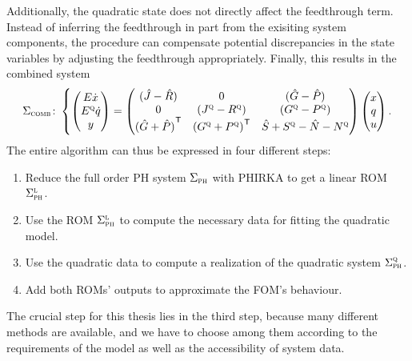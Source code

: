 Additionally, the quadratic state does not directly affect the feedthrough term.
Instead of inferring the feedthrough in part from the exisiting system components, the procedure can compensate potential discrepancies in the state variables by adjusting the feedthrough appropriately.
Finally, this results in the combined system
\begin{equation}\label{eq:combined-quadratic-system}
    \Sigma_{\textnormal{\scshape comb}} \colon \left\lbrace
    \begin{pmatrix}
        E \dot{x} \\
        E^{\textnormal{\scshape q}} \dot{q} \\
        y
    \end{pmatrix} = \begin{pmatrix}
        (\hat{J} - \hat{R}) & 0 & (\hat{G} - \hat{P}) \\
        0 & (J^{\textnormal{\scshape q}} - R^{\textnormal{\scshape q}}) & (G^{\textnormal{\scshape q}} - P^{\textnormal{\scshape q}}) \\
        {(\hat{G} + \hat{P})}^{\mkern1mu \mathsf{T}} & {(G^{\textnormal{\scshape q}} + P^{\textnormal{\scshape q}})}^{\mkern1mu \mathsf{T}} & \hat{S} + S^{\textnormal{\scshape q}} - \hat{N} - N^{\textnormal{\scshape q}}
    \end{pmatrix} \begin{pmatrix}
        x \\
        q \\
        u
    \end{pmatrix}.
    \right.
\end{equation}
The entire algorithm can thus be expressed in four different steps:
\begin{enumerate}
    \item Reduce the full order \ac{PH} system $\Sigma_{\textnormal{\scshape ph}}$ with \ac{PHIRKA} to get a linear \ac{ROM} $\Sigma_{\textnormal{\scshape ph}}^{\textnormal{\scshape l}}$.
    \item Use the \ac{ROM} $\Sigma_{\textnormal{\scshape ph}}^{\textnormal{\scshape l}}$ to compute the necessary data for fitting the quadratic model.
    \item Use the quadratic data to compute a realization of the quadratic system $\Sigma_{\textnormal{\scshape ph}}^{\textnormal{\scshape q}}$.
    \item Add both \acp{ROM}' outputs to approximate the \ac{FOM}'s behaviour.
\end{enumerate}
The crucial step for this thesis lies in the third step, because many different methods are available, and we have to choose among them according to the requirements of the model as well as the accessibility of system data.


